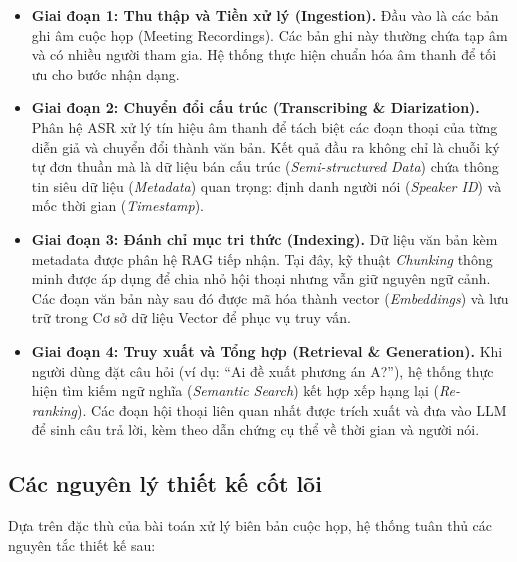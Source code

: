 \begin{itemize}
    \item \textbf{Giai đoạn 1: Thu thập và Tiền xử lý (Ingestion).} Đầu vào là các bản ghi âm cuộc họp (Meeting Recordings). Các bản ghi này thường chứa tạp âm và có nhiều người tham gia. Hệ thống thực hiện chuẩn hóa âm thanh để tối ưu cho bước nhận dạng.
    
    \item \textbf{Giai đoạn 2: Chuyển đổi cấu trúc (Transcribing \& Diarization).} Phân hệ ASR xử lý tín hiệu âm thanh để tách biệt các đoạn thoại của từng diễn giả và chuyển đổi thành văn bản. Kết quả đầu ra không chỉ là chuỗi ký tự đơn thuần mà là dữ liệu bán cấu trúc (\textit{Semi-structured Data}) chứa thông tin siêu dữ liệu (\textit{Metadata}) quan trọng: định danh người nói (\textit{Speaker ID}) và mốc thời gian (\textit{Timestamp}).
    
    \item \textbf{Giai đoạn 3: Đánh chỉ mục tri thức (Indexing).} Dữ liệu văn bản kèm metadata được phân hệ RAG tiếp nhận. Tại đây, kỹ thuật \textit{Chunking} thông minh được áp dụng để chia nhỏ hội thoại nhưng vẫn giữ nguyên ngữ cảnh. Các đoạn văn bản này sau đó được mã hóa thành vector (\textit{Embeddings}) và lưu trữ trong Cơ sở dữ liệu Vector để phục vụ truy vấn.
    
    \item \textbf{Giai đoạn 4: Truy xuất và Tổng hợp (Retrieval \& Generation).} Khi người dùng đặt câu hỏi (ví dụ: ``Ai đề xuất phương án A?''), hệ thống thực hiện tìm kiếm ngữ nghĩa (\textit{Semantic Search}) kết hợp xếp hạng lại (\textit{Re-ranking}). Các đoạn hội thoại liên quan nhất được trích xuất và đưa vào LLM để sinh câu trả lời, kèm theo dẫn chứng cụ thể về thời gian và người nói.
\end{itemize}

\subsection{Các nguyên lý thiết kế cốt lõi}
Dựa trên đặc thù của bài toán xử lý biên bản cuộc họp, hệ thống tuân thủ các nguyên tắc thiết kế sau:

